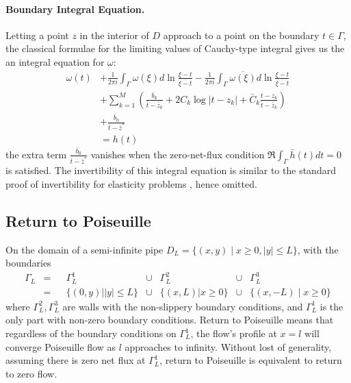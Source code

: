 \documentclass[10pt,twocolumn]{article}
\newtheorem[L]{thm}{Theorem}[section]
\begin{document}
\paragraph*{Boundary Integral Equation.} 
Letting a point $z$ in the interior of $D$ approach to a point on the boundary $t\in \Gamma$, 
the classical formulae for the limiting values of Cauchy-type integral 
gives us the an integral equation for $\omega$:
\begin{align}
  \omega(t) 
  &+ \frac 1{2\pi i} \int_{\Gamma} \omega(\xi) d \ln \frac{\xi - t}{\overline{\xi - t}} - \frac 1{2\pi i} \int_\Gamma \overline{\omega(\xi)} d \ln \frac{\xi - t}{\overline{\xi - t}} \\
  &+ \sum_{k=1}^M \left( \frac{\bar b_k}{\bar t- \bar z_k} +  2C_k \log |t-z_k| + \bar C_k \frac{t-z_k}{\bar t - \bar z_k} \right) \nonumber\\
  &+ \frac{\overline b_0}{\bar t - \bar z^*} \nonumber \\
  &= h(t)
\end{align}
the extra term $\frac{\overline b_0}{\bar t - \bar z^*}$ vanishes when the zero-net-flux condition $\Re \int_\Gamma \bar h(t) dt = 0$ is satisfied. 
The invertibility of this integral equation is similar 
to the standard proof of invertibility for elasticity problems \cite{muskhelishviliBasicProblemsMathematical1977}, hence omitted.

\subsection{Return to Poiseuille\label{sec:ret2poi}} 

On the domain of a semi-infinite pipe $D_L = \{(x,y)\mid x \ge 0, |y| \le L\}$, with the boundaries 
\begin{align}
  \Gamma_L &=&& \Gamma_L^1\quad\quad\quad& \cup &\Gamma_L^2 &\cup&\Gamma_L^3 \\
  &=&&\{(0,y)||y| \le L \}& \cup &\{(x,L)|x\ge 0\} &\cup& \{(x,-L)\mid x\ge 0\}\nonumber
\end{align}
where $\Gamma_L^2,\Gamma_L^3$ are walls with the non-slippery boundary conditions, 
and $\Gamma_L^1$ is the only part with non-zero boundary conditions. 
Return to Poiseuille means that regardless of the boundary conditions on $\Gamma_L^1$,
the flow's profile at $x = l$ will converge Poiseuille flow as $l$ approaches to infinity. Without lost of generality, assuming there is zero net flux at $\Gamma_L^1$,
return to Poiseuille is equivalent to return to zero flow. 
\end{document}
